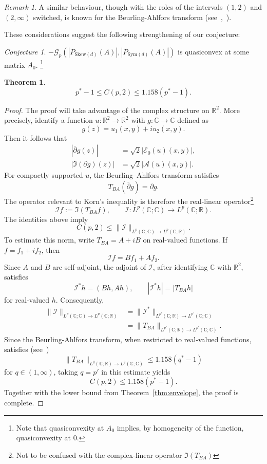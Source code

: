 \documentclass[11pt, a4paper]{amsart}
\newtheorem{theorem}{Theorem}[section]
\theoremstyle{definition}
\theoremstyle{remark}
\newtheorem{remark}{Remark}
\newtheorem*{conjecture}{Conjecture}
\newcommand{\R}{\mathbb{R}}
\newcommand{\C}{\mathbb{C}}
\begin{document}
\begin{remark}
A similar behaviour, though with the roles
of the intervals $(1,2)$ and $(2,\infty)$
switched, is known for the Beurling-Ahlfors transform
(see~\cite{Banuelos2013},~\cite
{Strzelecki2017TheFunctions}).
\end{remark}
These considerations suggest the following
strengthening of our conjecture:
\begin{conjecture}
$-\mathcal G_p(|P_{\mathrm{Skew}(d)}(A)|,
|P_{\mathrm{Sym}(d)}(A)|)$
is quasiconvex at some matrix $A_0$.
\footnote{Note that quasiconvexity at $A_0$ implies,
by homogeneity of the function, quasiconvexity at $0$.}
\end{conjecture}
\begin{theorem}\label{thm:Korn2d-bound}
    \begin{equation} \label{eq:Korn2d-bound}
        p^*-1\le C(p,2)\le 1.158(p^*-1).
    \end{equation}
\end{theorem}
\begin{proof}
    The proof will take advantage of the complex structure on 
    $\R^2$. More precisely,
identify a function $u\colon \R^2\to \R^2$
with $g\colon \C\to \C$
defined as
\[
g(z)=u_1(x,y)+iu_2(x,y).
\]
Then it follows that
\begin{align*}
    |\bar \partial g(z)|&=
    \sqrt 2|\mathcal E_0(u)(x,y)|,\\
    |\Im(\partial g)(z)|&=
    \sqrt 2|\mathcal A(u)(x,y)|.
\end{align*}
For compactly supported $u$, the Beurling--Ahlfors
transform satisfies
\[
    T_{BA}(\bar\partial g)=\partial g.
\]
The operator relevant to Korn's inequality is therefore the
real-linear operator\footnote{Not to be confused with the complex-linear operator $\Im(T_{BA})$}
\[
    \mathcal I f\mathrel{:=}\Im(T_{BA}f),
    \qquad
    \mathcal I\colon L^p(\C;\C)\longrightarrow L^p(\C;\R).
\]
The identities above imply
\begin{equation}\label{eq:Korn-via-BA}
    C(p,2)\le \|\mathcal I\|_{L^p(\C;\C)\to L^p(\C;\R)}.
\end{equation}
To estimate this norm, write $T_{BA}=A+iB$ on real-valued
functions. If $f=f_1+if_2$, then
\[
    \mathcal I f=Bf_1+Af_2.
\]
Since $A$ and $B$ are self-adjoint, the adjoint of $\mathcal I$,
after identifying $\C$ with $\R^2$, satisfies
\[
    \mathcal I^*h=(Bh,Ah),
    \qquad |\mathcal I^*h|=|T_{BA}h|
\]
for real-valued $h$. Consequently,
\begin{align*}
\|\mathcal I\|_{L^p(\C;\C)\to L^p(\C;\R)}
&=\|\mathcal I^*\|_{L^{p'}(\C;\R)\to L^{p'}(\C;\C)}\\
&=\|T_{BA}\|_{L^{p'}(\C;\R)\to L^{p'}(\C;\C)}.
\end{align*}
Since the Beurling-Ahlfors transform, when restricted to real-valued functions, satisfies
(see~\cite[p.~46]{Banuelos2026Cotlar})
\[
    \|T_{BA}\|_{L^q(\C;\R)\to L^q(\C;\C)}
    \le 1.158(q^*-1)
\]
for $q\in(1,\infty)$,
taking $q=p'$ in this
estimate yields
\[
    C(p,2)\le 1.158(p^*-1).
\]
Together with the lower bound from Theorem~\ref{thm:envelope},
the proof is complete.
\end{proof}
\end{document}
